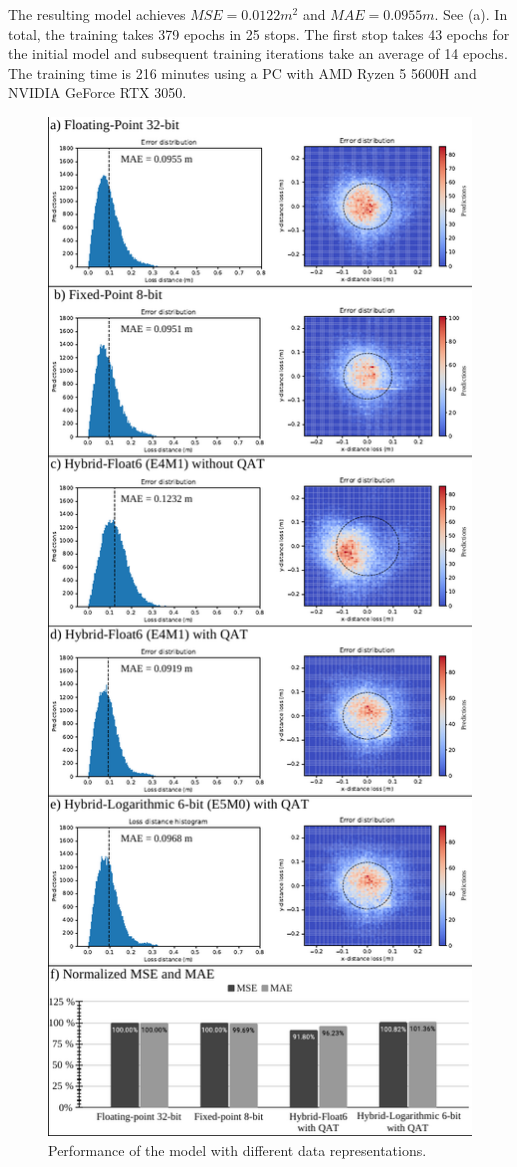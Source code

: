 The resulting model achieves $MSE=0.0122m^2$ and $MAE=0.0955m$. See (a). In total, the training takes 379 epochs in 25 stops. The first stop takes 43 epochs for the initial model and subsequent training iterations take an average of 14 epochs. The training time is 216 minutes using a PC with AMD Ryzen 5 5600H and NVIDIA GeForce RTX 3050.

\begin{figure}[h!]
	\centering
	\includegraphics[width=\columnwidth]{../figures/histograms/model_evaluation.pdf}
	\caption{Performance of the model with different data representations.}
	\label{fig:model_evaluation}
\end{figure}

